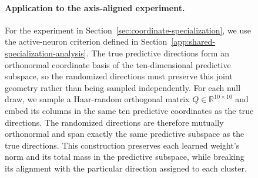 \documentclass{article}
\begin{document}
\begin{figure}
\paragraph{Application to the axis-aligned experiment.}
For the experiment in Section~\ref{sec:coordinate-specialization}, we use the
active-neuron criterion defined in
Section~\ref{app:shared-specialization-analysis}. The true predictive
directions form an orthonormal coordinate basis of the ten-dimensional
predictive subspace, so the randomized directions must preserve this joint
geometry rather than being sampled independently.
For each null draw, we sample a Haar-random orthogonal matrix
\(Q\in\mathbb R^{10\times10}\) and embed its columns in the same ten
predictive coordinates as the true directions. The randomized directions are
therefore mutually orthonormal and span exactly the same predictive subspace
as the true directions. This construction preserves each learned weight's
norm and its total mass in the predictive subspace, while breaking its
alignment with the particular direction assigned to each cluster.


\end{figure}
\end{document}
